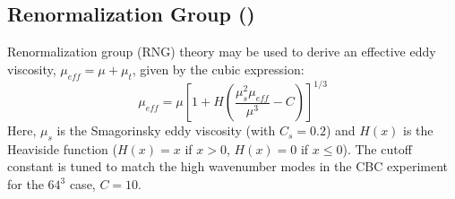 \documentclass[11pt]{book}
\begin{document}
\clearpage

\subsection{Renormalization Group (\texorpdfstring{}{rng})}
\label{RNG_model}

Renormalization group (RNG) theory \cite{Yakhot:1989} may be used to derive an effective eddy viscosity, $\mu_{\si{eff}} = \mu + \mu_t$, given by the cubic expression:
\begin{equation}
\label{eq:rng}
\mu_{\si{eff}} = \mu\left[1 + H\left( \frac{\mu_s^2 \mu_{\si{eff}}}{\mu^3} - C \right)\right]^{1/3}
\end{equation}
Here, $\mu_s$ is the Smagorinsky eddy viscosity (with $C_s=0.2$) and $H(x)$ is the Heaviside function ($H(x)=x$ if $x>0$, $H(x)=0$ if $x\le0$).  The cutoff constant is tuned to match the high wavenumber modes in the CBC experiment for the $64^3$ case, $C=10$.
\end{document}
